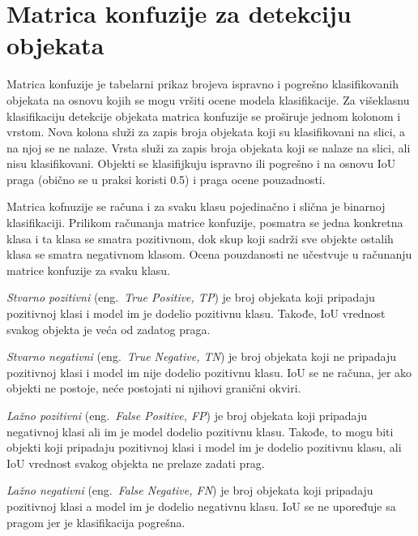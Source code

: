 \documentclass[12pt,oneside]{memoir}
\begin{document}
\section{Matrica konfuzije za detekciju objekata}
Matrica konfuzije je tabelarni prikaz brojeva ispravno i pogrešno klasifikovanih objekata na osnovu kojih se mogu vršiti ocene modela klasifikacije. Za višeklasnu klasifikaciju detekcije objekata matrica konfuzije se proširuje jednom kolonom i vrstom. Nova kolona služi za zapis broja objekata koji su klasifikovani na slici, a na njoj se ne nalaze. Vrsta služi za zapis broja objekata koji se nalaze na slici, ali nisu klasifikovani. Objekti se klasifijkuju ispravno ili pogrešno i na osnovu IoU praga (obično se u praksi koristi 0.5) i praga ocene pouzadnosti.

Matrica kofnuzije se računa i za svaku klasu pojedinačno i slična je binarnoj klasifikaciji. Prilikom računanja matrice konfuzije, posmatra se jedna konkretna klasa i ta klasa se smatra pozitivnom, dok skup koji sadrži sve objekte ostalih klasa se smatra negativnom klasom. Ocena pouzdanosti ne učestvuje u računanju matrice konfuzije za svaku klasu.

\textit{Stvarno pozitivni} (eng.~\textit{True Positive, TP}) je broj objekata koji pripadaju pozitivnoj klasi i model im je dodelio pozitivnu klasu. Takođe, IoU vrednost svakog objekta je veća od zadatog praga.

\textit{Stvarno negativni} (eng.~\textit{True Negative, TN}) je broj objekata koji ne pripadaju pozitivnoj klasi i model im nije dodelio pozitivnu klasu. IoU se ne računa, jer ako objekti ne postoje, neće postojati ni njihovi granični okviri.

\textit{Lažno pozitivni} (eng.~\textit{False Positive, FP}) je broj objekata koji pripadaju negativnoj klasi ali im je model dodelio pozitivnu klasu. Takođe, to mogu biti objekti koji pripadaju pozitivnoj klasi i model im je dodelio pozitivnu klasu, ali IoU vrednost svakog objekta ne prelaze zadati prag.

\textit{Lažno negativni} (eng.~\textit{False Negative, FN}) je broj objekata koji pripadaju pozitivnoj klasi a model im je dodelio negativnu klasu. IoU se ne upoređuje sa pragom jer je klasifikacija pogrešna. 
\end{document}
